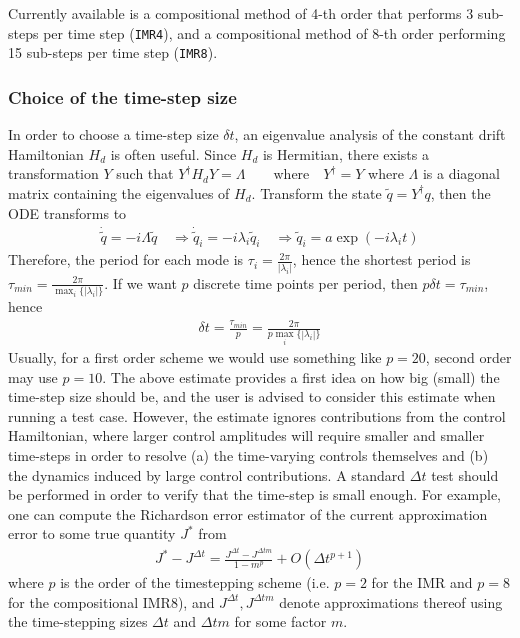 \documentclass[11pt]{article}
\begin{document}
    Currently available is a compositional method of 4-th order that performs 3 sub-steps per time step (\texttt{IMR4}), and a compositional method of 8-th order performing 15 sub-steps per time step (\texttt{IMR8}).

    \subsubsection{Choice of the time-step size}
    In order to choose a time-step size $\delta t$, an eigenvalue analysis of
    the constant drift Hamiltonian $H_d$ is often useful. Since $H_d$ is Hermitian, there exists a transformation $Y$ such that $Y^{\dagger}H_d Y = \Lambda \qquad  \text{where} \quad Y^{\dagger} = Y$ where $\Lambda$ is a diagonal matrix containing the eigenvalues of $H_d$.
       Transform the state $\tilde q = Y^{\dagger} q$, then the ODE transforms to 
       \begin{align*}
         \dot \tilde q = -i \Lambda \tilde q \quad \Rightarrow \dot \tilde q_i =
         -i\lambda_i \tilde q_i \quad \Rightarrow \tilde q_i = a
         \exp(-i\lambda_i t)
       \end{align*}
       Therefore, the period for each mode is $\tau_i =
       \frac{2\pi}{|\lambda_i|}$, hence the shortest period is $\tau_{min} =
       \frac{2\pi}{\max_i\{|\lambda_i|\}}$. If we want $p$ discrete time points
       per period, then $p\delta t = \tau_{min}$, hence 
       \begin{align} \label{eq:timestepsize}
         \delta t = \frac{\tau_{min}}{p} = \frac{2\pi}{p\max_i\{|\lambda_i|\}}
       \end{align}
       Usually, for a first order scheme we would use something like $p=20$,
       second order may use $p=10$. The above estimate provides a first idea on how big (small) the time-step size should be, and the user is advised to consider this estimate when running a test case. However, the estimate ignores contributions from the control Hamiltonian, where larger control amplitudes will require smaller and smaller time-steps in order to resolve (a) the time-varying controls themselves and (b) the dynamics induced by large control contributions. A standard $\Delta t$ test should be performed in order to verify that the time-step is small enough. For example, one can compute the Richardson error estimator of the current approximation error to some true quantity $J^*$ from
       \begin{align}
         J^* - J^{\Delta t} = \frac{J^{\Delta t} - J^{\Delta t m}}{1-m^p} + O(\Delta t^{p+1})
       \end{align}
       where $p$ is the order of the timestepping scheme (i.e. $p=2$ for the IMR and $p=8$ for the compositional IMR8), and $J^{\Delta t}, J^{\Delta tm}$ denote approximations thereof using the time-stepping sizes $\Delta t$ and $\Delta t m$ for some factor $m$.        
       
\end{document}
